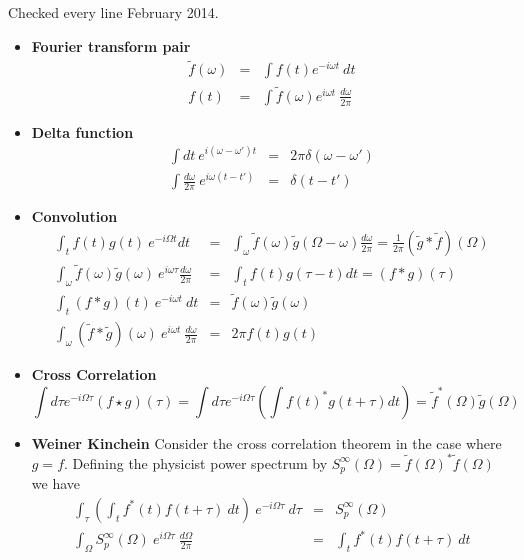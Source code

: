 \documentclass{article}
\begin{document}
Checked every line February 2014.

\begin{itemize}
\item \textbf{Fourier transform pair} \begin{eqnarray*}
\tilde{f}(\omega) & = & \int f(t)e^{-i\omega t}~dt\\
f(t) & = & \int\tilde{f}(\omega)e^{i\omega t}~\frac{d\omega}{2\pi}\end{eqnarray*}

\item \textbf{Delta function} \begin{eqnarray*}
\int dt~e^{i(\omega-\omega')t} & = & 2\pi\delta(\omega-\omega')\\
\int\frac{d\omega}{2\pi}~e^{i\omega(t-t')} & = & \delta(t-t')\end{eqnarray*}

\item \textbf{Convolution} \begin{eqnarray*}
\int_{t}f(t)g(t)~e^{-i\Omega t}dt & = & \int_{\omega}\tilde{f}(\omega)\tilde{g}(\Omega-\omega)\frac{d\omega}{2\pi}=\frac{1}{2\pi}(\tilde{g}*\tilde{f})(\Omega)\\
\int_{\omega}\tilde{f}(\omega)\tilde{g}(\omega)~e^{i\omega\tau}\frac{d\omega}{2\pi} & = & \int_{t}f(t)g(\tau-t)dt=(f*g)(\tau)\\
\int_{t}(f*g)(t)~e^{-i\omega t}~dt & = & \tilde{f}(\omega)\tilde{g}(\omega)\\
\int_{\omega}(\tilde{f}*\tilde{g})(\omega)~e^{i\omega t}~\frac{d\omega}{2\pi} & = & 2\pi f(t)g(t)\end{eqnarray*}

\item \textbf{Cross Correlation}\begin{equation}
\int d\tau e^{-i\Omega\tau}\left(f\star g\right)(\tau) = \int d\tau e^{-i\Omega\tau}\left(\int f(t)^{*}g(t+\tau)dt\right)=\tilde{f}^{*}(\Omega)\tilde{g}(\Omega) \nonumber \end{equation}

\item \textbf{Weiner Kinchein} Consider the cross correlation theorem in
the case where $g=f$. Defining the physicist power spectrum by $S_{p}^{\infty}(\Omega)=\tilde{f}(\Omega)^{*}\tilde{f}(\Omega)$
we have \begin{eqnarray*}
\int_{\tau}\left(\int_{t}f^{*}(t)f(t+\tau)~dt\right)~e^{-i\Omega\tau}~d\tau & = & S_{p}^{\infty}(\Omega)\\
\int_{\Omega}S_{p}^{\infty}(\Omega)~e^{i\Omega\tau}~\frac{d\Omega}{2\pi} & = & \int_{t}f^{*}(t)f(t+\tau)~dt\end{eqnarray*}
\end{itemize}
\end{document}
